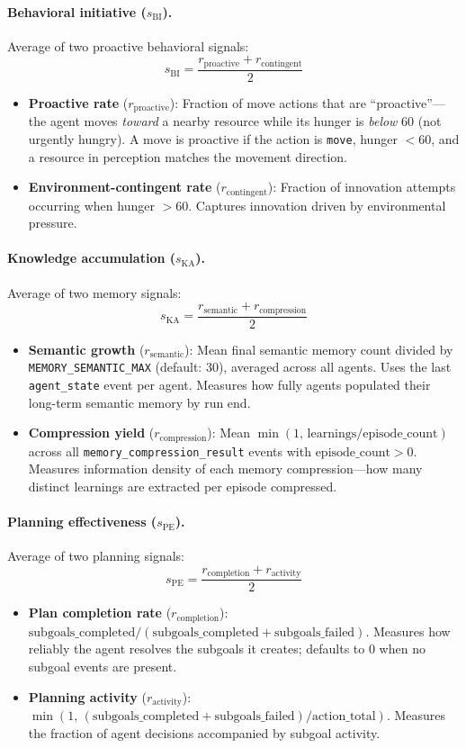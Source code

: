 \documentclass[a4paper, 11pt]{article}
\begin{document}
\paragraph{Behavioral initiative ($s_{\text{BI}}$).} Average of two proactive behavioral signals:
\[
    s_{\text{BI}} = \frac{r_{\text{proactive}} + r_{\text{contingent}}}{2}
\]
\begin{itemize}[nosep]
    \item \textbf{Proactive rate} ($r_{\text{proactive}}$): Fraction of move actions that are ``proactive''---the agent moves \emph{toward} a nearby resource while its hunger is \emph{below} $60$ (not urgently hungry). A move is proactive if the action is \texttt{move}, hunger $< 60$, and a resource in perception matches the movement direction.
    \item \textbf{Environment-contingent rate} ($r_{\text{contingent}}$): Fraction of innovation attempts occurring when hunger $> 60$. Captures innovation driven by environmental pressure.
\end{itemize}

\paragraph{Knowledge accumulation ($s_{\text{KA}}$).} Average of two memory signals:
\[
    s_{\text{KA}} = \frac{r_{\text{semantic}} + r_{\text{compression}}}{2}
\]
\begin{itemize}[nosep]
    \item \textbf{Semantic growth} ($r_{\text{semantic}}$): Mean final semantic memory count divided by \texttt{MEMORY\_SEMANTIC\_MAX} (default: 30), averaged across all agents. Uses the last \texttt{agent\_state} event per agent. Measures how fully agents populated their long-term semantic memory by run end.
    \item \textbf{Compression yield} ($r_{\text{compression}}$): Mean $\min(1,\, \text{learnings} / \text{episode\_count})$ across all \texttt{memory\_compression\_result} events with $\text{episode\_count} > 0$. Measures information density of each memory compression---how many distinct learnings are extracted per episode compressed.
\end{itemize}

\paragraph{Planning effectiveness ($s_{\text{PE}}$).} Average of two planning signals:
\[
    s_{\text{PE}} = \frac{r_{\text{completion}} + r_{\text{activity}}}{2}
\]
\begin{itemize}[nosep]
    \item \textbf{Plan completion rate} ($r_{\text{completion}}$): $\text{subgoals\_completed} / (\text{subgoals\_completed} + \text{subgoals\_failed})$. Measures how reliably the agent resolves the subgoals it creates; defaults to $0$ when no subgoal events are present.
    \item \textbf{Planning activity} ($r_{\text{activity}}$): $\min(1,\, (\text{subgoals\_completed} + \text{subgoals\_failed}) / \text{action\_total})$. Measures the fraction of agent decisions accompanied by subgoal activity.
\end{itemize}
\end{document}
